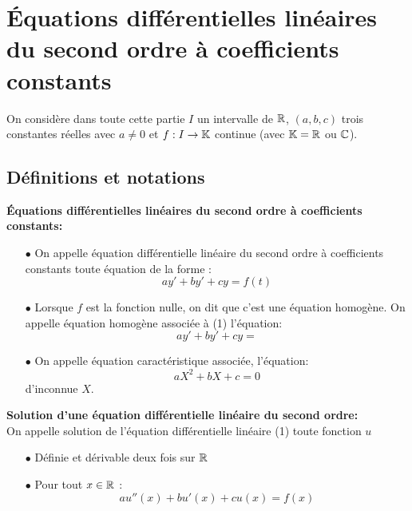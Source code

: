 \documentclass[a4paper, 11pt]{article}
\begin{document}
 

\section{\'Equations diff\'erentielles lin\'eaires du second ordre \`a coefficients constants}

\noindent On consid\`{e}re dans toute cette partie $I$ un intervalle de $\mathbb{R}$, $(a,b,c)$ trois constantes r\'eelles avec $a\not= 0$ et $f: I\rightarrow \mathbb{K}$ continue (avec $\mathbb{K}=\mathbb{R}$ ou $\mathbb{C}$).


\subsection{D\'efinitions et notations}

 {\noindent  

\begin{defi}
\textbf{\'Equations diff\'erentielles lin\'eaires du second ordre \`a coefficients constants:}
\begin{itemize}
 \item[$\bullet$] On appelle \'equation diff\'erentielle lin\'eaire du second ordre \`a coefficients constants toute \'equation de la forme : 
 $$ay'+by'+cy=f(t)$$

\item[$\bullet$] Lorsque $f$ est la fonction nulle, on dit que c'est une \'equation homogène.
\noindent On appelle \'equation homog\`ene associ\'ee \`a (1) l'\'equation:  $$ay'+by'+cy=$$
\item[$\bullet$] On appelle \'equation caract\'eristique associ\'ee, l'\'equation: $$aX^2+bX+c=0$$d'inconnue $X$.
\end{itemize}
\end{defi}
 
}\vsec


 {\noindent  

\begin{defi}
\textbf{Solution d'une \'equation diff\'erentielle lin\'eaire du second ordre:}\\
\noindent On appelle solution de l'\'equation diff\'erentielle lin\'eaire (1) toute fonction $u$ 
\begin{itemize}
\item[$\bullet$] Définie et dérivable deux fois sur $\mathbb{R}$ 
\item[$\bullet$] Pour tout $x\in \mathbb{R}$ : $$au''(x) +bu'(x) +cu(x)=f(x)$$
\end{itemize}
\end{defi}
 
}\vsec
\end{document}
